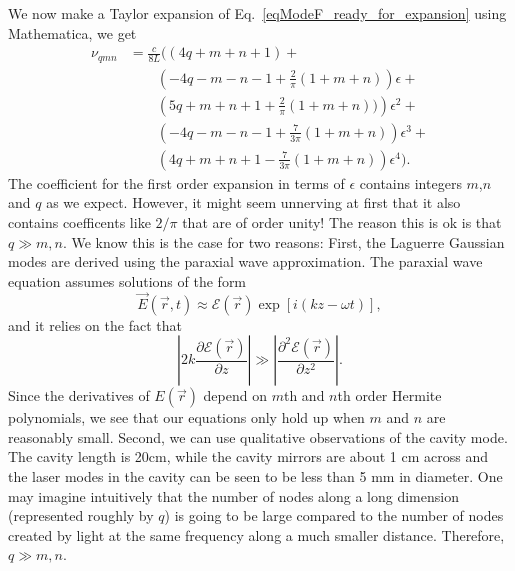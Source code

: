 We now make a Taylor expansion of Eq.\ \ref{eqModeF_ready_for_expansion} using Mathematica, we get 
\begin{align*}
\nu_{qmn}&=\frac{c}{8L}\biggl((4q+m+n+1) +\\
& \quad \quad \left(-4q-m-n-1+\frac{2}{\pi}(1+m+n)\right)\epsilon+\\
& \quad \quad \left(5q+m+n+1+\frac{2}{\pi}(1+m+n))\right)\epsilon^2+\\
& \quad \quad \left(-4q-m-n-1+\frac{7}{3\pi}(1+m+n)\right)\epsilon^3+\\
& \quad \quad \left(4q+m+n+1-\frac{7}{3\pi}(1+m+n)\right)\epsilon^4
\biggr).
\end{align*}
The coefficient for the first order expansion in terms of $\epsilon$ contains integers $m$,$n$ and $q$ as we expect. 
However, it might seem unnerving at first that it also contains coefficents like $2/\pi$ that are of order unity! The reason this is ok is that $q\gg m,n$. We know this is the case for two reasons: First, the Laguerre Gaussian modes are derived using the paraxial wave approximation. The paraxial wave equation assumes solutions of the form
\begin{equation}
\vec{E}(\vec{r},t)\approx \mathcal{E}(\vec{r})\exp[i(kz-\omega t)],
\end{equation}
and it relies on the fact that 
\begin{equation}
\left|2k\frac{\partial \mathcal{E}(\vec{r})}{\partial z}\right|\gg\left|\frac{\partial^2\mathcal{E}(\vec{r})}{\partial z^2}\right|.
\end{equation}
Since the derivatives of $E(\vec{r})$ depend on $m$th and $n$th order Hermite polynomials, we see that our equations only hold up when $m$ and $n$ are reasonably small. 
Second, we can use qualitative observations of the cavity mode. The cavity length is 20cm, while the cavity mirrors are about 1 cm across and the laser modes in the cavity can be seen to be less than 5 mm in diameter. One may imagine intuitively that the number of nodes along a long dimension (represented roughly by $q$) is going to be large compared to the number of nodes created by light at the same frequency along a much smaller distance. Therefore, $q\gg m,n$.


